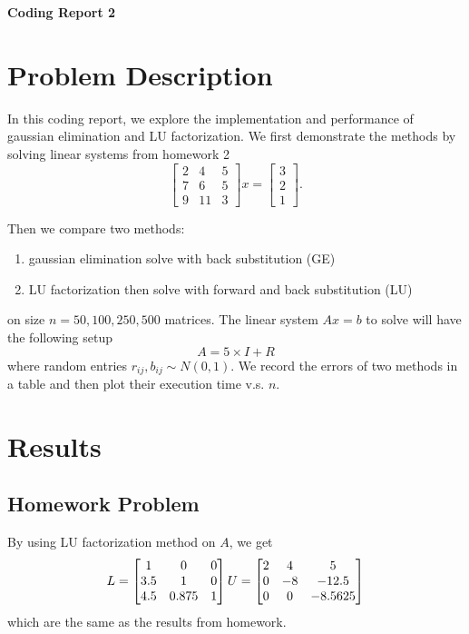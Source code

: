 \documentclass[a4paper,12pt]{article}
\begin{document}
\begin{center} %
	{\Large \bf Coding Report 2} %
	\vspace{2mm}
\end{center}  


\section{Problem Description}
In this coding report,
we explore the implementation and performance of gaussian elimination and LU factorization.
We first demonstrate the methods by solving linear systems from homework 2
$$
\begin{bmatrix}
	2 & 4 & 5 \\
	7 & 6 & 5 \\
	9 & 11 & 3
\end{bmatrix}
x = 
\begin{bmatrix}
	3 \\
	2 \\
	1
\end{bmatrix}.
$$

Then we compare two methods:
\begin{enumerate}
	\item gaussian elimination solve with back substitution (GE)
	\item LU factorization then solve with forward and back substitution (LU)
\end{enumerate}
on size $n = 50, 100, 250, 500$ matrices.
The linear system $Ax = b$ to solve will have the following setup
$$
A = 5\times I + R
$$
where random entries $r_{ij}, b_{ij} \sim N(0, 1)$.
We record the errors of two methods in a table and then plot their execution time v.s. $n$.

\section{Results}

\subsection{Homework Problem}
By using LU factorization method on $A$, we get
$$
L = \begin{bmatrix}
	1 & 0 & 0 \\
	3.5 & 1 & 0 \\
	4.5 & 0.875 & 1 
\end{bmatrix} \\
U = \begin{bmatrix}
	2 & 4 & 5 \\
	0 & -8 & -12.5 \\
	0 & 0 & -8.5625
\end{bmatrix}
$$
which are the same as the results from homework.
\end{document}
